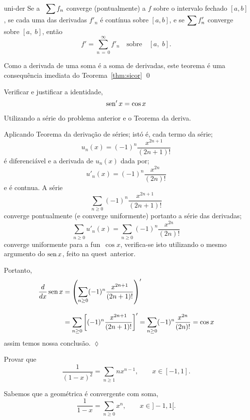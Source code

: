\begin{theoc}{}{uni-der}
Se a \ser\ $\displaystyle{\sum f_n}$ converge (pontualmente) a $f$  sobre o
intervalo fechado $[a, b]$, se cada uma das derivadas $f'_n$ é
contínua sobre $[a,b]$, e se $\displaystyle{\sum f'_n}$ converge \unif sobre
$[a,\;  b]$, então 
\begin{equation*}
f'=\sum_{n\,=\, 0}^{\infty} f'_n \quad  \text{sobre} \quad [a,\; b].
\end{equation*}
\end{theoc}

\prova Como a derivada de uma soma é a soma de derivadas, este
teorema é uma consequência imediata do Teorema~\ref{thm:sicor} \qed

\begin{exer}
Verificar e justificar  a identidade,
$$
\operatorname{sen}' x= \cos x
$$

Utilizando a s\'erie do problema anterior e o Teorema da
deriva\cao.
\end{exer}

\solo Aplicando Teorema da derivação de s\'eries; ist\'o \'e, cada
termo da s\'erie;
$$
u_n(x)=(-1)^n\frac{x^{2n+1}}{(2n+1)!}
$$
\'e diferenciável e a derivada de $u_n(x)$ dada por;
$$
u'_n(x)=(-1)^n\frac{x^{2n}}{(2n)!}
$$
e \'e cont\ii nua. A s\'erie
$$
\sum_{n\geq 0}(-1)^n\frac{x^{2n+1}}{(2n+1)!}
$$
converge pontualmente (e converge uniformente) portanto a s\'erie
das derivadas;
$$
\sum_{n\geq 0}u'_n(x) =\sum_{n\geq
0}(-1)^n\frac{x^{2n}}{(2n)!}
$$
converge uniformente para a fun\cao\ $\cos x$, verifica-se isto
utilizando o mesmo argumento do $\operatorname{sen} x$, feito na quest\ao\
anterior.

Portanto,
\begin{align*} \frac{d}{dx}\operatorname{sen} x&=\left( \sum_{n\geq
0}(-1)^n\frac{x^{2n+1}}{(2n+1)!} \right)'\\[2ex]
 &=\sum_{n\geq
0}\left[(-1)^n\frac{x^{2n+1}}{(2n+1)!}\right]'=\sum_{n\geq
0}(-1)^n\frac{x^{2n}}{(2n)!}=\cos x
\end{align*}
assim temos nossa conclusão. \hfill \(\lozenge\)

\begin{exer}
Provar que
\begin{equation*}
    \frac{1}{(1-x)^2}=\sum_{n\ge 1}nx^{n-1},\qquad x\in [-1,1].
\end{equation*}
\end{exer}

\solo Sabemos que a \ser geométrica é convergente com soma,
\begin{equation*}
 \frac{1}{1-x}=\sum_{n\ge 0}x^{n},\qquad x\in ]-1,1[.
\end{equation*}

